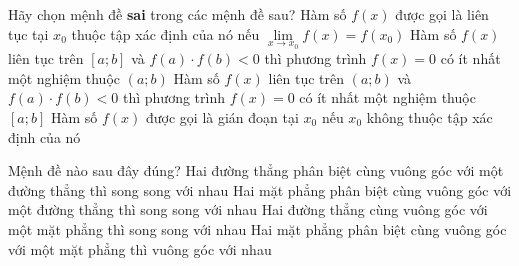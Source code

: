 \begin{ex}%
	Hãy chọn mệnh đề {\bf sai} trong các mệnh đề sau?
	\choice
	{Hàm số $f(x)$ được gọi là liên tục tại $x_0$ thuộc tập xác định của nó nếu $\displaystyle \lim \limits_{x\to x_0} f(x)=f(x_0)$}
	{ Hàm số $f(x)$ liên tục trên $[a;b]$ và $f(a)\cdot f(b)<0$ thì phương trình $f(x)=0$ có ít nhất một nghiệm thuộc $(a;b)$}
	{\True  Hàm số $f(x)$ liên tục trên $(a;b)$ và $f(a)\cdot f(b)<0$ thì phương trình $f(x)=0$ có ít nhất một nghiệm thuộc $[a;b]$}
	{Hàm số $f(x)$ được gọi là gián đoạn tại $x_0$ nếu $x_0$ không thuộc tập xác định của nó} 
	\loigiai{
		
	} 
\end{ex}

\begin{ex}%
	Mệnh đề nào sau đây đúng?
	\choice
	{Hai đường thẳng phân biệt cùng vuông góc với một đường thẳng thì song song với nhau}
	{\True Hai mặt phẳng phân biệt cùng vuông góc với một đường thẳng thì song song với nhau}
	{ Hai đường thẳng cùng vuông góc với một mặt phẳng thì song song với nhau}
	{Hai mặt phẳng phân biệt cùng vuông góc với một mặt phẳng thì vuông góc với nhau}
	\loigiai{
		
	} 
\end{ex}

